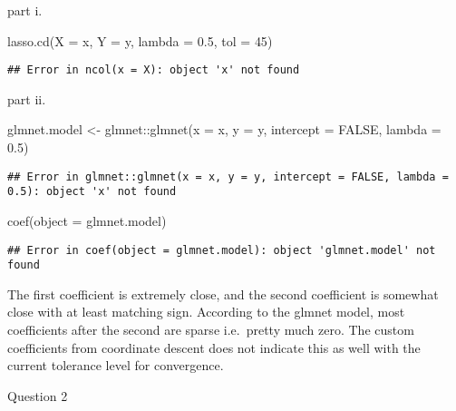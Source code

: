 \documentclass[
]{article}
\newenvironment{Shaded}{\begin{snugshade}}{\end{snugshade}}
\newcommand{\AttributeTok}[1]{\textcolor[rgb]{0.77,0.63,0.00}{#1}}
\newcommand{\ConstantTok}[1]{\textcolor[rgb]{0.00,0.00,0.00}{#1}}
\newcommand{\DecValTok}[1]{\textcolor[rgb]{0.00,0.00,0.81}{#1}}
\newcommand{\FloatTok}[1]{\textcolor[rgb]{0.00,0.00,0.81}{#1}}
\newcommand{\FunctionTok}[1]{\textcolor[rgb]{0.00,0.00,0.00}{#1}}
\newcommand{\NormalTok}[1]{#1}
\newcommand{\OtherTok}[1]{\textcolor[rgb]{0.56,0.35,0.01}{#1}}
\newcommand{\SpecialCharTok}[1]{\textcolor[rgb]{0.00,0.00,0.00}{#1}}
\begin{document}
part i.

\begin{Shaded}
\begin{Highlighting}[]
\FunctionTok{lasso.cd}\NormalTok{(}\AttributeTok{X =}\NormalTok{ x, }\AttributeTok{Y =}\NormalTok{ y, }\AttributeTok{lambda =} \FloatTok{0.5}\NormalTok{, }\AttributeTok{tol =} \DecValTok{45}\NormalTok{)}
\end{Highlighting}
\end{Shaded}

\begin{verbatim}
## Error in ncol(x = X): object 'x' not found
\end{verbatim}

part ii.

\begin{Shaded}
\begin{Highlighting}[]
\NormalTok{glmnet.model }\OtherTok{\textless{}{-}}\NormalTok{ glmnet}\SpecialCharTok{::}\FunctionTok{glmnet}\NormalTok{(}\AttributeTok{x =}\NormalTok{ x, }\AttributeTok{y =}\NormalTok{ y, }\AttributeTok{intercept =} \ConstantTok{FALSE}\NormalTok{, }\AttributeTok{lambda =} \FloatTok{0.5}\NormalTok{)}
\end{Highlighting}
\end{Shaded}

\begin{verbatim}
## Error in glmnet::glmnet(x = x, y = y, intercept = FALSE, lambda = 0.5): object 'x' not found
\end{verbatim}

\begin{Shaded}
\begin{Highlighting}[]
\FunctionTok{coef}\NormalTok{(}\AttributeTok{object =}\NormalTok{ glmnet.model)}
\end{Highlighting}
\end{Shaded}

\begin{verbatim}
## Error in coef(object = glmnet.model): object 'glmnet.model' not found
\end{verbatim}

The first coefficient is extremely close, and the second coefficient is
somewhat close with at least matching sign. According to the glmnet
model, most coefficients after the second are sparse i.e.~pretty much
zero. The custom coefficients from coordinate descent does not indicate
this as well with the current tolerance level for convergence.

Question 2
\end{document}

